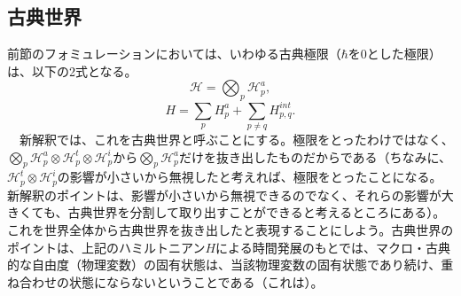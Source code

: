 \subsection{古典世界}
前節のフォミュレーションにおいては、いわゆる古典極限（$\hbar$を$0$とした極限）は、以下の2式となる。
\begin{equation}
    \mathcal{H} = \bigotimes_p \mathcal{H}_p^a,
\end{equation}
\begin{equation}
H=\sum_pH_p^a+ \sum_{p \neq q} H^{int}_{p,q}.
\end{equation}
　新解釈では、これを古典世界と呼ぶことにする。極限をとったわけではなく、$\bigotimes_p \mathcal{H}_p^a \otimes  \mathcal{H}_p^t \otimes  \mathcal{H}_p^i$から$\bigotimes_p \mathcal{H}_p^a$だけを抜き出したものだからである（ちなみに、$\mathcal{H}_p^t \otimes  \mathcal{H}_p^i$の影響が小さいから無視したと考えれば、極限をとったことになる。新解釈のポイントは、影響が小さいから無視できるのでなく、それらの影響が大きくても、古典世界を分割して取り出すことができると考えるところにある）。これを世界全体から古典世界を抜き出したと表現することにしよう。古典世界のポイントは、上記のハミルトニアン$H$による時間発展のもとでは、マクロ・古典的な自由度（物理変数）の固有状態は、当該物理変数の固有状態であり続け、重ね合わせの状態にならないということである（これは）。